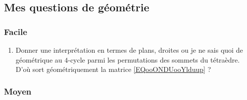 \subsection{Mes questions de géométrie}

\subsubsection{Facile}

\begin{enumerate}
    \item
        Donner une interprétation en termes de plans, droites ou je ne sais quoi de géométrique au \( 4\)-cycle parmi les permutations des sommets du tétraèdre. D'où sort géométriquement la matrice \eqref{EQooONDUooYlduup} ?
\end{enumerate}

\subsubsection{Moyen}

